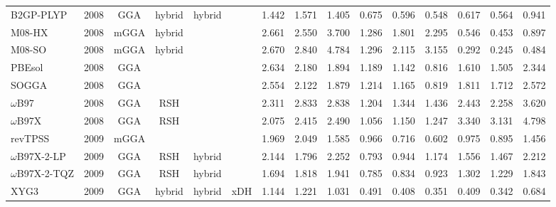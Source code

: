 \begin{landscape}
\begin{longtable}{ll:cccc:rrr:rrr:rrr}
    B2GP-PLYP        & 2008 & GGA  & hybrid   & hybrid      &           & 1.442             & 1.571             & 1.405  & 0.675              & 0.596             & 0.548  & 0.617   & 0.564 & 0.941 \\
    M08-HX           & 2008 & mGGA & hybrid   &             &           & 2.661             & 2.550             & 3.700  & 1.286              & 1.801             & 2.295  & 0.546   & 0.453 & 0.897 \\
    M08-SO           & 2008 & mGGA & hybrid   &             &           & 2.670             & 2.840             & 4.784  & 1.296              & 2.115             & 3.155  & 0.292   & 0.245 & 0.484 \\
    PBEsol           & 2008 & GGA  &          &             &           & 2.634             & 2.180             & 1.894  & 1.189              & 1.142             & 0.816  & 1.610   & 1.505 & 2.344 \\
    SOGGA            & 2008 & GGA  &          &             &           & 2.554             & 2.122             & 1.879  & 1.214              & 1.165             & 0.819  & 1.811   & 1.712 & 2.572 \\
    $\omega$B97             & 2008 & GGA  & RSH      &             &           & 2.311             & 2.833             & 2.838  & 1.204              & 1.344             & 1.436  & 2.443   & 2.258 & 3.620 \\
    $\omega$B97X            & 2008 & GGA  & RSH      &             &           & 2.075             & 2.415             & 2.490  & 1.056              & 1.150             & 1.247  & 3.340   & 3.131 & 4.798 \\
    revTPSS          & 2009 & mGGA &          &             &           & 1.969             & 2.049             & 1.585  & 0.966              & 0.716             & 0.602  & 0.975   & 0.895 & 1.456 \\
    $\omega$B97X-2-LP       & 2009 & GGA  & RSH      & hybrid      &           & 2.144             & 1.796             & 2.252  & 0.793              & 0.944             & 1.174  & 1.556   & 1.467 & 2.212 \\
    $\omega$B97X-2-TQZ      & 2009 & GGA  & RSH      & hybrid      &           & 1.694             & 1.818             & 1.941  & 0.785              & 0.834             & 0.923  & 1.302   & 1.229 & 1.843 \\
    XYG3             & 2009 & GGA  & hybrid   & hybrid      & xDH       & 1.144             & 1.221             & 1.031  & 0.491              & 0.408             & 0.351  & 0.409   & 0.342 & 0.684 \\

\end{longtable}
\end{landscape}
